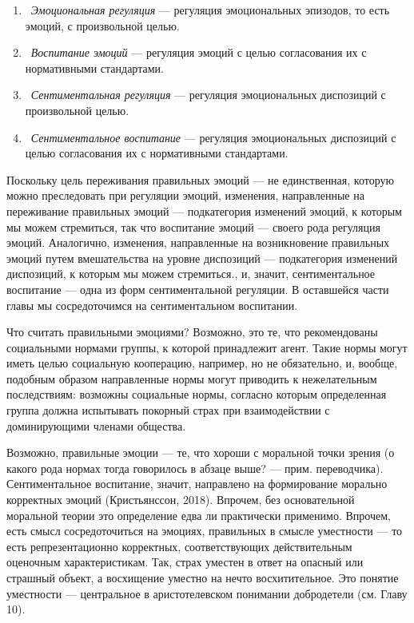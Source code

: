 \documentclass[11pt]{book}
\begin{document}
\begin{enumerate}
  \item\ \textit{Эмоциональная регуляция} --- регуляция эмоциональных эпизодов, то есть эмоций, с произвольной целью.
  \item\ \textit{Воспитание эмоций} --- регуляция эмоций с целью согласования их с нормативными стандартами.
  \item\ \textit{Сентиментальная регуляция} --- регуляция эмоциональных диспозиций с произвольной целью.
  \item\ \textit{Сентиментальное воспитание} --- регуляция эмоциональных диспозиций с целью согласования их с нормативными стандартами.
\end{enumerate}

Поскольку цель переживания правильных эмоций --- не единственная, которую можно преследовать при регуляции эмоций, изменения, направленные на переживание правильных эмоций --- подкатегория изменений эмоций, к которым мы можем стремиться, так что воспитание эмоций --- своего рода регуляция эмоций. Аналогично, изменения, направленные на возникновение правильных эмоций путем вмешательства на уровне диспозиций --- подкатегория изменений диспозиций, к которым мы можем стремиться., и, значит, сентиментальное воспитание --- одна из форм сентиментальной регуляции. В оставшейся части главы мы сосредоточимся на сентиментальном воспитании.

Что считать правильными эмоциями? Возможно, это те, что рекомендованы социальными нормами группы, к которой принадлежит агент. Такие нормы могут иметь целью социальную кооперацию, например, но не обязательно, и, вообще, подобным образом направленные нормы могут приводить к нежелательным последствиям: возможны социальные нормы, согласно которым определенная группа должна испытывать покорный страх при взаимодействии с доминирующими членами общества.

Возможно, правильные эмоции --- те, что хороши с моральной точки зрения (о какого рода нормах тогда говорилось в абзаце выше? --- прим. переводчика). Сентиментальное воспитание, значит, направлено на формирование морально корректных эмоций (Кристьянссон, 2018). Впрочем, без основательной моральной теории это определение едва ли практически применимо. Впрочем, есть смысл сосредоточиться на эмоциях, правильных в смысле уместности --- то есть репрезентационно корректных, соответствующих действительным оценочным характеристикам. Так, страх уместен в ответ на опасный или страшный объект, а восхищение уместно на нечто восхитительное. Это понятие уместности --- центральное в аристотелевском понимании добродетели (см. Главу 10).
\end{document}
